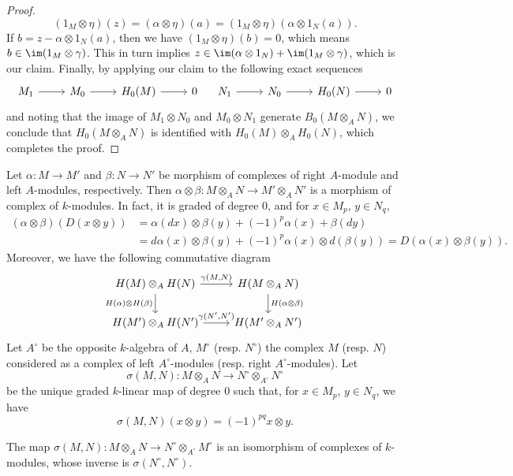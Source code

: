 \begin{proof}
\[(1_M\otimes\eta)(z)=(\alpha\otimes\eta)(a)=(1_M\otimes\eta)(\alpha\otimes 1_N(a)).\]
If $b=z-\alpha\otimes 1_N(a)$, then we have $(1_M\otimes\eta)(b)=0$, which means $b\in\im(1_M\otimes\gamma)$. This in turn implies $z\in\im(\alpha\otimes 1_N)+\im(1_M\otimes\gamma)$, which is our claim. Finally, by applying our claim to the following exact sequences
\[\begin{tikzcd}
M_1\ar[r]&M_0\ar[r]&H_0(M)\ar[r]&0
\end{tikzcd}\quad \begin{tikzcd}
N_1\ar[r]&N_0\ar[r]&H_0(N)\ar[r]&0
\end{tikzcd}\]
and noting that the image of $M_1\otimes N_0$ and $M_0\otimes N_1$ generate $B_0(M\otimes_AN)$, we conclude that $H_0(M\otimes_AN)$ is identified with $H_0(M)\otimes_AH_0(N)$, which completes the proof.
\end{proof}
Let $\alpha:M\to M'$ and $\beta:N\to N'$ be morphism of complexes of right $A$-module and left $A$-modules, respectively. Then $\alpha\otimes\beta:M\otimes_AN\to M'\otimes_AN'$ is a morphism of complex of $k$-modules. In fact, it is graded of degree $0$, and for $x\in M_p$, $y\in N_q$,
\begin{align*}
(\alpha\otimes\beta)(D(x\otimes y))&=\alpha(dx)\otimes\beta(y)+(-1)^p\alpha(x)+\beta(dy)\\
&=d\alpha(x)\otimes\beta(y)+(-1)^p\alpha(x)\otimes d(\beta(y))=D(\alpha(x)\otimes\beta(y)).
\end{align*}
Moreover, we have the following commutative diagram
\[\begin{tikzcd}
H(M)\otimes_AH(N)\ar[r,"{\gamma(M,N)}"]\ar[d,swap,"H(\alpha)\otimes H(\beta)"]&H(M\otimes_AN)\ar[d,"H(\alpha\otimes\beta)"]\\
H(M')\otimes_AH(N')\ar[r,"{\gamma(N',N')}"]&H(M'\otimes_AN')
\end{tikzcd}\]
Let $A^{\circ}$ be the opposite $k$-algebra of $A$, $M^{\circ}$ (resp. $N^{\circ}$) the complex $M$ (resp. $N$) considered as a complex of left $A^{\circ}$-modules (resp. right $A^{\circ}$-modules). Let
\[\sigma(M,N):M\otimes_AN\to N^{\circ}\otimes_{A^{\circ}}N^{\circ}\]
be the unique graded $k$-linear map of degree $0$ such that, for $x\in M_p$, $y\in N_q$, we have
\[\sigma(M,N)(x\otimes y)=(-1)^{pq}x\otimes y.\]
\begin{proposition}
The map $\sigma(M,N):M\otimes_AN\to N^{\circ}\otimes_{A^{\circ}}M^{\circ}$ is an isomorphism of complexes of $k$-modules, whose inverse is $\sigma(N^{\circ},N^{\circ})$.
\end{proposition}
